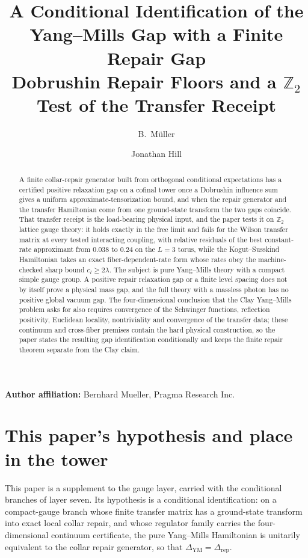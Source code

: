 \documentclass[11pt]{article}
\title{\textbf{A Conditional Identification of the Yang--Mills Gap with a Finite Repair Gap}\\
\large Dobrushin Repair Floors and a \(\mathbb Z_2\) Test of the Transfer Receipt}
\author{B.\ M\"uller \and Jonathan Hill}
\date{\OPHPaperReleaseDate}
\numberwithin{equation}{section}
\theoremstyle{remark}
\newcommand{\YM}{\mathrm{YM}}
\begin{document}
\maketitle
\OPHPaperReleaseBanner

\begin{center}
\small\textbf{Author affiliation:} Bernhard Mueller, Pragma Research Inc.
\end{center}

\begin{abstract}
A finite collar-repair generator built from orthogonal conditional
expectations has a certified positive relaxation gap on a cofinal tower once
a Dobrushin influence sum gives a uniform approximate-tensorization bound,
and when the repair generator and the transfer Hamiltonian come from one
ground-state transform the two gaps coincide. That transfer receipt is the
load-bearing physical input, and the paper tests it on \(\mathbb Z_2\)
lattice gauge theory: it holds exactly in the free limit and fails for the
Wilson transfer matrix at every tested interacting coupling, with relative
residuals of the best constant-rate approximant from \(0.038\) to \(0.24\) on
the \(L=3\) torus, while the Kogut--Susskind Hamiltonian takes an exact
fiber-dependent-rate form whose rates obey the machine-checked sharp bound
\(c_l\ge2\lambda\). The subject is pure Yang--Mills theory with a compact
simple gauge group. A positive repair relaxation gap or a finite level
spacing does not by itself prove a physical mass gap, and the full theory
with a massless photon has no positive global vacuum gap. The
four-dimensional conclusion that the Clay Yang--Mills problem asks for also
requires convergence of the Schwinger functions, reflection positivity,
Euclidean locality, nontriviality and convergence of the transfer data;
these continuum and cross-fiber premises contain the hard physical
construction, so the paper states the resulting gap identification
conditionally and keeps the finite repair theorem separate from the Clay
claim.
\end{abstract}



\section*{This paper's hypothesis and place in the tower}

This paper is a supplement to the gauge layer, carried with the conditional
branches of layer seven. Its hypothesis is a conditional identification: on
a compact-gauge branch whose finite transfer matrix has a ground-state
transform into exact local collar repair, and whose regulator family carries
the four-dimensional continuum certificate, the pure Yang--Mills Hamiltonian
is unitarily equivalent to the collar repair generator, so that
\(\Delta_{\YM}=\Delta_{\mathrm{rep}}\).
\end{document}
